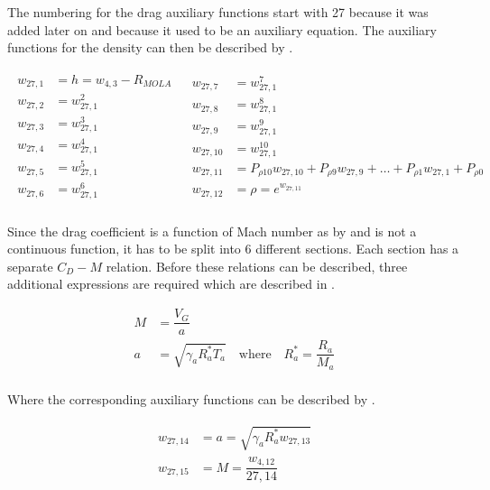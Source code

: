 The numbering for the drag auxiliary functions start with 27 because it was added later on and because it used to be an auxiliary equation. The auxiliary functions for the density can then be described by .

\begin{align} \label{eq:dragAuxF}
\begin{split}
w_{27,1} &= h = w_{4,3} - R_{MOLA} \\
w_{27,2} &= w_{27,1}^{2}\\
w_{27,3} &= w_{27,1}^{3}\\
w_{27,4} &= w_{27,1}^{4}\\
w_{27,5} &= w_{27,1}^{5}\\
w_{27,6} &= w_{27,1}^{6}\\
\end{split}
&
\begin{split}
w_{27,7} &= w_{27,1}^{7}\\
w_{27,8} &= w_{27,1}^{8}\\
w_{27,9} &= w_{27,1}^{9}\\
w_{27,10} &= w_{27,1}^{10}\\
w_{27,11} &= P_{\rho 10}w_{27,10}+P_{\rho 9}w_{27,9}+\dotsc +P_{\rho 1}w_{27,1}+P_{\rho 0}\\
w_{27,12} &= \rho = e^{w_{27,11}} \\
\end{split}
\end{align}

Since the drag coefficient is a function of Mach number as by  and is not a continuous function, it has to be split into 6 different sections. Each section has a separate $C_{D}-M$ relation. Before these relations can be described, three additional expressions are required which are described in .

 \begin{equation} \label{eq:cd}
\begin{split}
M &= \dfrac{V_{G}}{a} \\
a &= \sqrt{\gamma_{a}R_{a}^{*}T_{a}} \quad \text{where} \quad R_{a}^{*}=\dfrac{R_{a}}{M_{a}} \\
\end{split}
\end{equation}

Where the corresponding auxiliary functions can be described by .

\begin{align} \label{eq:cdAuxF}
\begin{split}
w_{27,14} &= a = \sqrt{\gamma_{a}R_{a}^{*}w_{27,13}}  \\
w_{27,15} &= M = \dfrac{w_{4,12}}{27,14} \\
\end{split}
\end{align}

